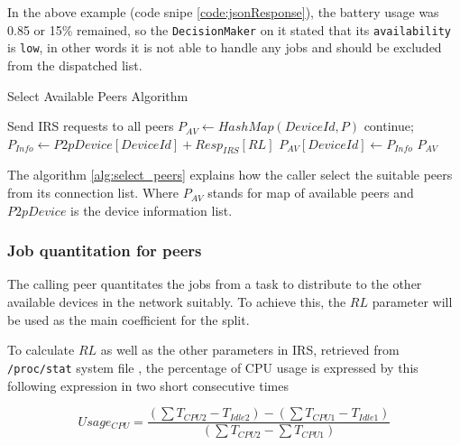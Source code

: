 \documentclass[conference]{IEEEtran}
\begin{document}
In the above example (code snipe \ref{code:jsonResponse}), the battery usage was 0.85 or 15\% remained, so the \texttt{DecisionMaker} on it stated that its \texttt{availability} is \texttt{low}, in other words it is not able to handle any jobs and should be excluded from the dispatched list.

\begin{algorithm}

\caption{Select Available Peers Algorithm}
\label{alg:select_peers}
\begin{algorithmic}[1] 
\begin{footnotesize}
\State Send IRS requests to all peers 
\State $P_{AV} \leftarrow HashMap(DeviceId, P)$
   \State continue;
\Else
  \State $P_{Info} \leftarrow P2pDevice[DeviceId] + Resp_{IRS}[RL]$
  \State $P_{AV}[DeviceId] \leftarrow P_{Info}$
\EndIf
\EndFor
\State \Return $P_{AV}$
\EndFunction
\end{footnotesize}
\end{algorithmic}

\end{algorithm}

The algorithm \ref{alg:select_peers} explains how the caller select the suitable peers from its connection list. Where $P_{AV}$ stands for map of available peers and $P2pDevice$ is the device information list.\\

\subsubsection{Job quantitation for peers}\label{ss_jqfp}

The calling peer quantitates the jobs from a task to distribute to the other available devices in the network suitably. To achieve this, the $RL$ parameter will be used as the main coefficient for the split. 
 
To calculate $RL$ as well as the other parameters in IRS, retrieved from \texttt{/proc/stat} system file \cite{stat_explain}, the percentage of CPU usage is expressed by this following expression in two short consecutive times

\begin{equation}
\label{eq:cpu_usage}
Usage_{CPU} = \frac{(\sum{T_{CPU2}} - T_{Idle2}) - (\sum{T_{CPU1}} - T_{Idle1})}{(\sum{T_{CPU2}} - \sum{T_{CPU1}})}
\end{equation}
\end{document}
